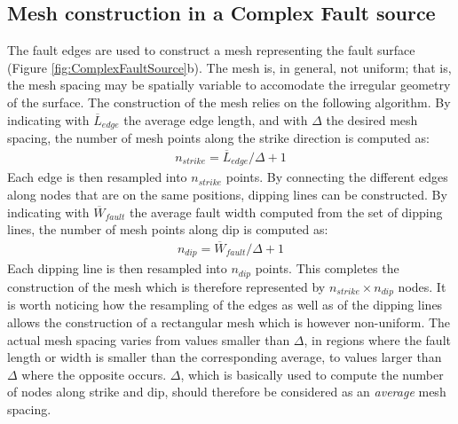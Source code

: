 \subsection{Mesh construction in a Complex Fault source}
The fault edges are used to construct a mesh representing the fault surface 
(Figure \ref{fig:ComplexFaultSource}b). The mesh is, in general, not uniform; that is,
the mesh spacing may be spatially variable to accomodate the irregular geometry of the surface.
The construction of the mesh relies on the following algorithm. By indicating with
$\overline{L}_{edge}$ the average edge length, and with $\Delta$
the desired mesh spacing, the number of mesh points along the strike direction is computed as:
\begin{align}
n_{strike} = \overline{L}_{edge} / \Delta + 1
\end{align}
Each edge is then resampled into $n_{strike}$ points. By connecting the different edges along
nodes that are on the same positions, dipping lines can be constructed. By indicating with
$\overline{W}_{fault}$ the average fault width computed from the set of dipping lines, the
number of mesh points along dip is computed as:
\begin{align}
n_{dip} = \overline{W}_{fault}/  \Delta + 1
\end{align}
Each dipping line is then resampled into $n_{dip}$ points. This completes the construction of
the mesh which is therefore represented by $n_{strike} \times n_{dip}$ nodes. It is worth noticing
how the resampling of the edges as well as of the dipping lines allows the construction of a rectangular
mesh which is however non-uniform. The actual mesh spacing varies from values smaller than $\Delta$,
in regions where the fault length or width is smaller than the corresponding average, to values larger than
$\Delta$ where the opposite occurs. $\Delta$, which is basically used to compute the number of nodes along
strike and dip, should therefore be considered as an \textit{average} mesh spacing.

